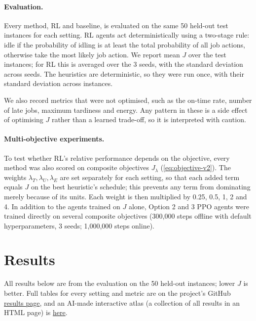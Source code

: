 \documentclass[12pt]{article}
\begin{document}
\paragraph{Evaluation.}\label{sec:evaluation} Every method, RL and baseline, is evaluated on the same 50 held-out test instances for each setting. RL agents act deterministically using a two-stage rule: idle if the probability of idling is at least the total probability of all job actions, otherwise take the most likely job action. We report mean $J$ over the test instances; for RL this is averaged over the 3 seeds, with the standard deviation across seeds. The heuristics are deterministic, so they were run once, with their standard deviation across instances.

We also record metrics that were not optimised, such as the on-time rate, number of late jobs, maximum tardiness and energy. Any pattern in these is a side effect of optimising $J$ rather than a learned trade-off, so it is interpreted with caution.

\paragraph{Multi-objective experiments.}\label{sec:mo-method} To test whether RL's relative performance depends on the objective, every method was also scored on composite objectives $J_\lambda$ (\cref{eq:objective-v2}). The weights $\lambda_T, \lambda_U, \lambda_E$ are set separately for each setting, so that each added term equals $J$ on the best heuristic's schedule; this prevents any term from dominating merely because of its units. Each weight is then multiplied by 0.25, 0.5, 1, 2 and 4. In addition to the agents trained on $J$ alone, Option 2 and 3 PPO agents were trained directly on several composite objectives (300,000 steps offline with default hyperparameters, 3 seeds; 1,000,000 steps online).

\section{Results}\label{sec:results}
All results below are from the evaluation on the 50 held-out instances; lower $J$ is better. Full tables for every setting and metric are on the project's GitHub \href{https://github.com/Ethan-Ty-Riekert/Neural-Knapsack-Research-Project/tree/main/Results}{results page}, and an AI-made interactive atlas (a collection of all results in an HTML page) is \href{https://github.com/Ethan-Ty-Riekert/Neural-Knapsack-Research-Project/tree/main/Results}{here}. %
\end{document}
